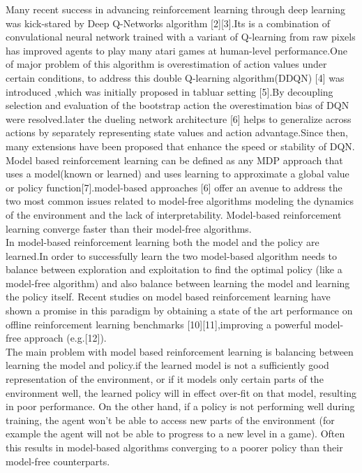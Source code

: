Many recent success in advancing reinforcement learning   through deep learning was kick-stared by Deep Q-Networks algorithm [2][3].Its is a combination of convulational neural network trained with a variant of Q-learning from raw pixels has improved agents to play many atari games at human-level performance.One of major problem of this algorithm is  overestimation of  action values under certain conditions, to address this   double Q-learning algorithm(DDQN)  [4] was introduced ,which was initially proposed in tabluar setting [5].By decoupling selection and evaluation of the bootstrap action the overestimation bias of DQN were resolved.later the dueling network architecture [6] helps to generalize across actions by separately representing state values and action advantage.Since then, many extensions have been proposed that enhance the speed or stability of DQN.\\

Model based reinforcement learning can be defined as any MDP approach that uses a model(known or learned) and uses learning to approximate a global value or policy function[7].model-based approaches [6] offer an avenue to address the two most common issues related to model-free algorithms   modeling the dynamics of the environment and the lack of interpretability. Model-based reinforcement learning  converge  faster than their model-free algorithms.\\

In model-based reinforcement learning both the model and the policy are learned.In order to successfully learn the two  model-based algorithm needs to  balance between exploration and exploitation to find the optimal policy (like a model-free algorithm) and also balance between learning the model and learning the policy itself. Recent studies on model based reinforcement learning have shown a promise in this paradigm by obtaining a state of the art performance on offline reinforcement learning benchmarks [10][11],improving a powerful model-free approach (e.g.[12]).\\

The main problem with model based reinforcement learning is balancing between learning the model and policy.if the learned model is not a sufficiently good representation of the environment, or if it models only certain parts of the environment well, the learned policy will in effect over-fit on that model, resulting in poor performance. On the other hand, if a policy is not performing well during training, the agent won’t be able to access new parts of the environment (for example the agent will not be able to progress to a new level in a game). Often this results in model-based algorithms converging to a poorer policy than their model-free counterparts.\\

